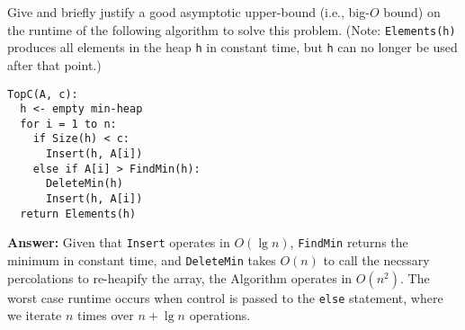 \documentclass[11pt, oneside]{article}   	%
\theoremstyle{definition}
\theoremstyle{remark}
\begin{document}
Give and briefly justify a good asymptotic upper-bound (i.e., big-$O$
bound) on the runtime of the following algorithm to solve this
problem. (Note: \texttt{Elements(h)} produces all elements in the heap \texttt{h} in
constant time, but \texttt{h} can no longer be used after that point.)

\begin{verbatim}
TopC(A, c):
  h <- empty min-heap
  for i = 1 to n:
    if Size(h) < c:
      Insert(h, A[i])
    else if A[i] > FindMin(h):
      DeleteMin(h)
      Insert(h, A[i])
  return Elements(h)
\end{verbatim}

\textbf{Answer: }Given that \texttt{Insert} operates in $O(\lg n)$, \texttt{FindMin} returns the minimum in constant time, and \texttt{DeleteMin} takes $O(n)$ to call the necssary percolations to re-heapify the array, the Algorithm operates in $O(n^2)$. The worst case runtime occurs when control is passed to the \texttt{else} statement, where we iterate $n$ times over $n+\lg n$ operations. 
\end{document}
